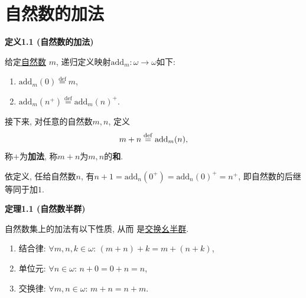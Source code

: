 \documentclass[UTF8]{ctexart}
\begin{document}
\setlength{\abovedisplayskip}{1pt}
\setlength{\belowdisplayskip}{1pt}

\section{自然数的加法}


\hypertarget{sec:定义1.1}{}
\noindent\textbf{定义1.1 (自然数的加法)}

给定\href{../01 自然数/01 自然数#nameddest=sec:定义1.3}{自然数} $m$,
递归定义映射$\mathrm{add}_m:\omega\to\omega$如下:
\begin{enumerate}
    \item $\mathrm{add}_m(0)\overset{\mathrm{def}}{=}m$,
    \item $\mathrm{add}_m(n^+)\overset{\mathrm{def}}{=}\mathrm{add}_m(n)^+$.
\end{enumerate}

接下来, 对任意的自然数$m,n$, 定义
\[
    m+n\overset{\mathrm{def}}{=}\mathrm{add}_m(n),\\[-3pt]
\]
称$+$为\textbf{加法}, 称$m+n$为$m,n$的\textbf{和}.

\vspace{10pt}

依定义, 任给自然数$n$, 有$n+1=\mathrm{add}_n(0^+)=\mathrm{add}_n(0)^+=n^+$,
即自然数的后继等同于加$1$.


\vspace{10pt}

\hypertarget{sec:定理1.1}{}
\noindent\textbf{定理1.1 (自然数半群)}

自然数集上的加法有以下性质, 从而
是\href{../../../05 抽象代数/01 群论/01 群、子群与商群/01 半群与群#nameddest=sec:定义1.1}
{交换幺半群}.
\begin{enumerate}
    \item 结合律: $\forall m,n,k\in\omega:\,(m+n)+k=m+(n+k)$,
    \item 单位元: $\forall n\in\omega:\,n+0=0+n=n$,
    \item 交换律: $\forall m,n\in\omega:\,m+n=n+m$.
\end{enumerate}

\end{document}
